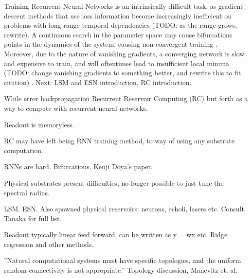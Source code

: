 Training Recurrent Neural Networks is an intrinsically difficult task, as
gradient descent methods that use loss information become increasingly
inefficient on problems with long-range temporal dependencies (TODO: as the
range grows, rewrite).  A continuous search in the parameter space may cause
bifurcations points in the dynamics of the system, causing non-convergent
training \cite{doya_bifurcations_nodate}. Moreover, due to the nature of
vanishing gradients, a converging network is slow and expensive to train, and
will oftentimes lead to insufficient local minima (TODO: change vanishing
gradients to something better, and rewrite this to fit citation)
\cite{bengio_learning_1994}. Next: LSM and ESN introduction, RC introduction.

While error backpropagation Recurrent Reservoir Computing (RC) but forth as a
way to compute with recurrent neural networks.

Readout is memoryless.

RC may have left being RNN training method, to way of using any substrate
computation.

RNNs are hard. Bifurcations. Kenji Doya's paper.

Physical substrates present difficulties, no longer possible to just tune the
spectral radius.

LSM. ESN. Also spawned physical reservoirs: neurons, echoli, lasers etc. Consult
Tanaka for full list.

Readout typically linear feed forward, can be written as y = wx etc. Ridge
regression and other methods.

''Natural computational systems must have specific topologies, and the uniform
random connectivity is not appropriate.'' Topology discussion, Manevitz et. al.

